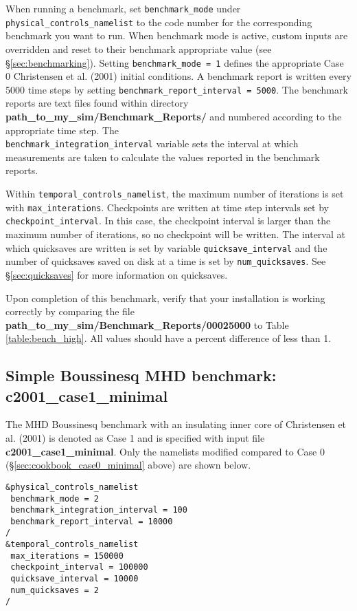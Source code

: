 When running a benchmark, set \texttt{benchmark\_mode} under \texttt{physical\_controls\_namelist} to the code number for the corresponding benchmark you want to run. When benchmark mode is active, custom inputs are overridden and reset to their benchmark appropriate value (see \S \ref{sec:benchmarking}). Setting \texttt{benchmark\_mode = 1} defines the appropriate Case 0 Christensen et al. (2001) initial conditions. A benchmark report is written every 5000 time steps  by setting \texttt{benchmark\_report\_interval = 5000}. The benchmark reports are text files found within directory \textbf{path\_to\_my\_sim/Benchmark\_Reports/} and numbered according to the appropriate time step. The \\\texttt{benchmark\_integration\_interval} variable sets the interval at which measurements are taken to calculate the values reported in the benchmark reports.    

Within \texttt{temporal\_controls\_namelist}, the maximum number of iterations is set with \texttt{max\_interations}. Checkpoints are written at time step intervals set by \texttt{checkpoint\_interval}. In this case, the checkpoint interval is larger than the maximum number of iterations, so no checkpoint will be written. The interval at which quicksaves are written is set by variable \texttt{quicksave\_interval} and the number of quicksaves saved on disk at a time is set by \texttt{num\_quicksaves}. See \S \ref{sec:quicksaves} for more information on quicksaves. 

Upon completion of this benchmark, verify that your installation is working correctly by comparing the file \\ \textbf{path\_to\_my\_sim/Benchmark\_Reports/00025000} to Table \ref{table:bench_high}. All values should have a percent difference of less than 1. 


\subsection{Simple Boussinesq MHD benchmark: c2001\_case1\_minimal}

The MHD Boussinesq benchmark with an insulating inner core of Christensen et al. (2001) is denoted as Case 1 and is specified with input file \textbf{c2001\_case1\_minimal}. Only the namelists modified compared to Case 0 (\S \ref{sec:cookbook_case0_minimal} above) are shown below.   
    
\begin{lstlisting}
&physical_controls_namelist
 benchmark_mode = 2
 benchmark_integration_interval = 100
 benchmark_report_interval = 10000
/
&temporal_controls_namelist
 max_iterations = 150000
 checkpoint_interval = 100000
 quicksave_interval = 10000
 num_quicksaves = 2
/
\end{lstlisting}    

